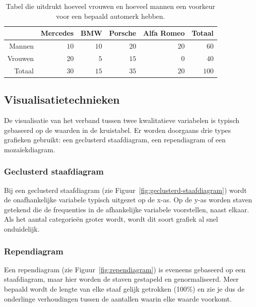 \begin{table} \centering
  \begin{tabular}{@{}rrrrrr@{}}
  	\toprule
  	        & Mercedes &  BMW & Porsche & Alfa Romeo & Totaal \\
  	\midrule
  	 Mannen &     $10$ & $10$ &    $20$ &       $20$ &   $60$ \\
  	Vrouwen &     $20$ &  $5$ &    $15$ &        $0$ &   $40$ \\
  	 Totaal &     $30$ & $15$ &    $35$ &       $20$ &  $100$ \\
  	\bottomrule
  \end{tabular}
  \caption{Tabel die uitdrukt hoeveel vrouwen en hoeveel mannen een voorkeur voor een bepaald automerk hebben.}
  \label{tab:autovoorkeur}
\end{table}

\subsection{Visualisatietechnieken}
\label{ssec:kwal-kwal-visualisatie}

De visualisatie van het verband tussen twee kwalitatieve variabelen is typisch gebaseerd op de waarden in de kruistabel. Er worden doorgaans drie types grafieken gebruikt: een geclusterd staafdiagram, een rependiagram of een mozaïekdiagram.

\subsubsection{Geclusterd staafdiagram}

Bij een geclusterd staafdiagram (zie Figuur~\ref{fig:geclusterd-staafdiagram}) wordt de onafhankelijke variabele typisch uitgezet op de x-as. Op de y-as worden staven getekend die de frequenties in de afhankelijke variabele voorstellen, naast elkaar. Als het aantal categorieën groter wordt, wordt dit soort grafiek al snel onduidelijk.

\subsubsection{Rependiagram}

Een rependiagram (zie Figuur~\ref{fig:rependiagram}) is eveneens gebaseerd op een staafdiagram, maar hier worden de staven gestapeld en genormaliseerd. Meer bepaald wordt de lengte van elke staaf gelijk getrokken (100\%) en zie je dus de onderlinge verhoudingen tussen de aantallen waarin elke waarde voorkomt.

